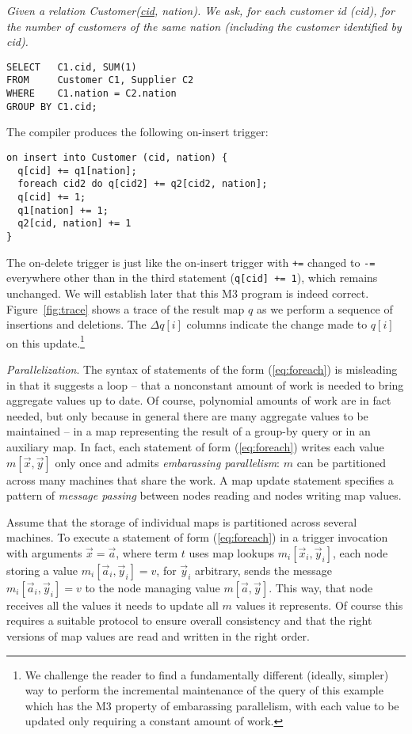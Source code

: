 \begin{example}\em
\label{ex:self-join}
Given a relation Customer(\underline{cid}, nation).
We ask, for each customer id (cid),
for the number of customers of the same nation (including the customer
identified by cid).
\begin{verbatim}
SELECT   C1.cid, SUM(1)
FROM     Customer C1, Supplier C2
WHERE    C1.nation = C2.nation
GROUP BY C1.cid;
\end{verbatim}
The compiler produces the following on-insert trigger:
\begin{verbatim}
on insert into Customer (cid, nation) {
  q[cid] += q1[nation];
  foreach cid2 do q[cid2] += q2[cid2, nation];
  q[cid] += 1;
  q1[nation] += 1;
  q2[cid, nation] += 1
}
\end{verbatim}
The on-delete trigger is just like the on-insert trigger with {\tt +=}
changed to {\tt -=} everywhere other than in the third statement
({\tt q[cid] += 1}), which remains unchanged.
We will establish later that this M3 program is indeed correct.
Figure~\ref{fig:trace} shows a trace of the result map $q$ as we perform
a sequence of insertions and deletions. The $\Delta q[i]$ columns
indicate the change made to $q[i]$ on this update.\footnote{We
challenge the reader to find a 
fundamentally different (ideally, simpler) way to
perform the incremental maintenance of the query of this example
which has the M3 property of embarassing parallelism, with each value
to be updated only requiring a constant amount of work.}
\punto
\end{example}


{\em Parallelization}.
The syntax of statements of the form (\ref{eq:foreach})
is misleading in that it suggests a loop --
that a nonconstant amount of work is needed to bring aggregate
values up to date. Of course, polynomial amounts of work are in fact needed,
but only because in general there are many aggregate values
to be maintained -- in a
map representing the result of a group-by query or in an auxiliary map.
In fact, each statement of form (\ref{eq:foreach})
writes each value $m[\vec{x}, \vec{y}]$ only once and admits
{\em embarassing parallelism}: $m$ can be partitioned across many machines
that share the work. A map update statement specifies a
pattern of {\em message passing} between nodes reading and nodes writing
map values.

Assume that the storage of individual maps
is partitioned across several machines. To execute a statement of form
(\ref{eq:foreach})
in a trigger invocation with arguments $\vec{x} = \vec{a}$,
where term $t$ uses map lookups $m_i[\vec{x}_i, \vec{y}_i]$,
each node storing a value $m_i[\vec{a}_i, \vec{y}_i] = v$,
for $\vec{y}_i$ arbitrary, sends the message
$m_i[\vec{a}_i, \vec{y}_i] = v$ to the node managing value
$m[\vec{a}, \vec{y}]$. This way, that node receives all the values it
needs to update all $m$ values it represents.
Of course this requires a suitable protocol to ensure overall consistency
and that the right versions of map values are read and written in the right
order.



